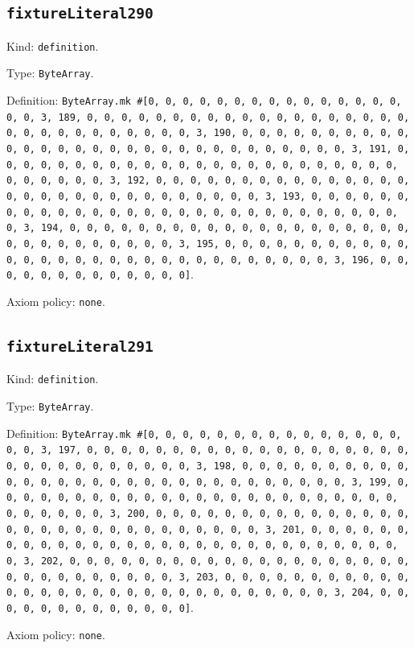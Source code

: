 \documentclass[11pt]{article}
\begin{document}
\subsection*{\texttt{fixtureLiteral290}}
\noindent Kind: \texttt{definition}.\par
\noindent Type: \texttt{ByteArray}.\par
\noindent Definition: \texttt{ByteArray.mk \#[0, 0, 0, 0, 0, 0, 0, 0, 0, 0, 0, 0, 0, 0, 0, 0, 0, 3, 189, 0, 0, 0, 0, 0, 0, 0, 0, 0, 0, 0, 0, 0, 0, 0, 0, 0, 0, 0, 0, 0, 0, 0, 0, 0, 0, 0, 0, 0, 0, 3, 190, 0, 0, 0, 0, 0, 0, 0, 0, 0, 0, 0, 0, 0, 0, 0, 0, 0, 0, 0, 0, 0, 0, 0, 0, 0, 0, 0, 0, 0, 0, 3, 191, 0, 0, 0, 0, 0, 0, 0, 0, 0, 0, 0, 0, 0, 0, 0, 0, 0, 0, 0, 0, 0, 0, 0, 0, 0, 0, 0, 0, 0, 0, 3, 192, 0, 0, 0, 0, 0, 0, 0, 0, 0, 0, 0, 0, 0, 0, 0, 0, 0, 0, 0, 0, 0, 0, 0, 0, 0, 0, 0, 0, 0, 0, 3, 193, 0, 0, 0, 0, 0, 0, 0, 0, 0, 0, 0, 0, 0, 0, 0, 0, 0, 0, 0, 0, 0, 0, 0, 0, 0, 0, 0, 0, 0, 0, 3, 194, 0, 0, 0, 0, 0, 0, 0, 0, 0, 0, 0, 0, 0, 0, 0, 0, 0, 0, 0, 0, 0, 0, 0, 0, 0, 0, 0, 0, 0, 0, 3, 195, 0, 0, 0, 0, 0, 0, 0, 0, 0, 0, 0, 0, 0, 0, 0, 0, 0, 0, 0, 0, 0, 0, 0, 0, 0, 0, 0, 0, 0, 0, 3, 196, 0, 0, 0, 0, 0, 0, 0, 0, 0, 0, 0, 0, 0]}.\par
\noindent Axiom policy: \texttt{none}.\par
\subsection*{\texttt{fixtureLiteral291}}
\noindent Kind: \texttt{definition}.\par
\noindent Type: \texttt{ByteArray}.\par
\noindent Definition: \texttt{ByteArray.mk \#[0, 0, 0, 0, 0, 0, 0, 0, 0, 0, 0, 0, 0, 0, 0, 0, 0, 3, 197, 0, 0, 0, 0, 0, 0, 0, 0, 0, 0, 0, 0, 0, 0, 0, 0, 0, 0, 0, 0, 0, 0, 0, 0, 0, 0, 0, 0, 0, 0, 3, 198, 0, 0, 0, 0, 0, 0, 0, 0, 0, 0, 0, 0, 0, 0, 0, 0, 0, 0, 0, 0, 0, 0, 0, 0, 0, 0, 0, 0, 0, 0, 3, 199, 0, 0, 0, 0, 0, 0, 0, 0, 0, 0, 0, 0, 0, 0, 0, 0, 0, 0, 0, 0, 0, 0, 0, 0, 0, 0, 0, 0, 0, 0, 3, 200, 0, 0, 0, 0, 0, 0, 0, 0, 0, 0, 0, 0, 0, 0, 0, 0, 0, 0, 0, 0, 0, 0, 0, 0, 0, 0, 0, 0, 0, 0, 3, 201, 0, 0, 0, 0, 0, 0, 0, 0, 0, 0, 0, 0, 0, 0, 0, 0, 0, 0, 0, 0, 0, 0, 0, 0, 0, 0, 0, 0, 0, 0, 3, 202, 0, 0, 0, 0, 0, 0, 0, 0, 0, 0, 0, 0, 0, 0, 0, 0, 0, 0, 0, 0, 0, 0, 0, 0, 0, 0, 0, 0, 0, 0, 3, 203, 0, 0, 0, 0, 0, 0, 0, 0, 0, 0, 0, 0, 0, 0, 0, 0, 0, 0, 0, 0, 0, 0, 0, 0, 0, 0, 0, 0, 0, 0, 3, 204, 0, 0, 0, 0, 0, 0, 0, 0, 0, 0, 0, 0, 0]}.\par
\noindent Axiom policy: \texttt{none}.\par
\end{document}
